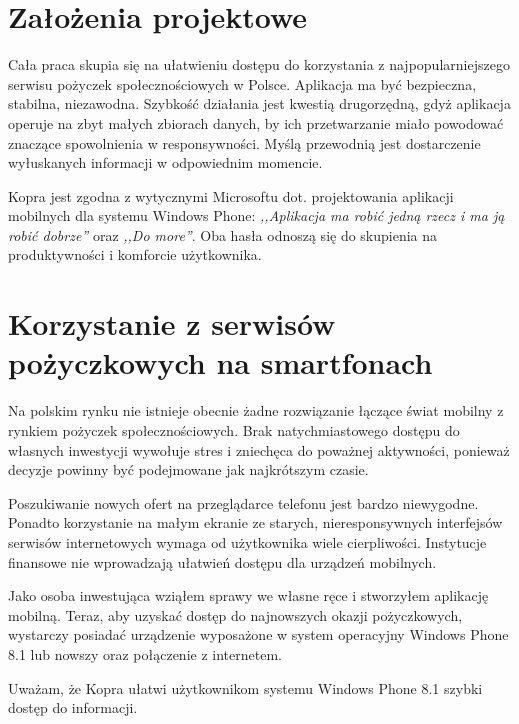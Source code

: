 \documentclass[a4paper,twoside,titlepage,openright]{book}
\begin{document}
\section*{Założenia projektowe}

Cała praca skupia się na ułatwieniu dostępu do korzystania z najpopularniejszego serwisu pożyczek społecznościowych w Polsce. Aplikacja ma być bezpieczna, stabilna, niezawodna. Szybkość działania jest kwestią drugorzędną, gdyż aplikacja operuje na zbyt małych zbiorach danych, by ich przetwarzanie miało powodować znaczące spowolnienia w responsywności. Myślą przewodnią jest dostarczenie wyłuskanych informacji w odpowiednim momencie. 

Kopra jest zgodna z wytycznymi Microsoftu dot. projektowania aplikacji mobilnych dla systemu Windows Phone: \textit{,,Aplikacja ma robić jedną rzecz i ma ją robić dobrze''}\cite{wpDesign} oraz \textit{,,Do more''}\cite{doMore}. Oba hasła odnoszą się do skupienia na produktywności i komforcie użytkownika. 

\section*{Korzystanie z serwisów pożyczkowych na smartfonach}

Na polskim rynku nie istnieje obecnie żadne rozwiązanie łączące świat mobilny z rynkiem pożyczek społecznościowych. Brak natychmiastowego dostępu do własnych inwestycji wywołuje stres i zniechęca do poważnej aktywności, ponieważ decyzje powinny być podejmowane jak najkrótszym czasie. 

Poszukiwanie nowych ofert na przeglądarce telefonu jest bardzo niewygodne. Ponadto korzystanie na małym ekranie ze starych, nieresponsywnych interfejsów serwisów internetowych wymaga od użytkownika wiele cierpliwości. Instytucje finansowe nie wprowadzają ułatwień dostępu dla urządzeń mobilnych. 

Jako osoba inwestująca wziąłem sprawy we własne ręce i stworzyłem aplikację mobilną. Teraz, aby uzyskać dostęp do najnowszych okazji pożyczkowych, wystarczy posiadać urządzenie wyposażone w system operacyjny Windows Phone 8.1 lub nowszy oraz połączenie z internetem.

Uważam, że Kopra ułatwi użytkownikom systemu Windows Phone 8.1 szybki dostęp do informacji.
\end{document}
